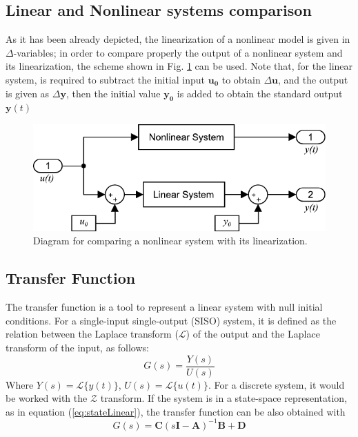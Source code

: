 \subsection{Linear and Nonlinear systems comparison}
As it has been already depicted, the linearization of a nonlinear model is given in $\Delta$-variables; in order to compare properly the output of a nonlinear system and its linearization, the scheme shown in Fig. \ref{fig:howto} can be used. Note that, for the linear system, is required to subtract the initial input $\mathbf{u_0}$ to obtain $\Delta\mathbf{u}$, and the output is given as $\Delta\mathbf{y}$, then the initial value $\mathbf{y_0}$ is added to obtain the standard output $\mathbf{y}(t)$
\begin{figure}[H]
    \centering
    \includegraphics[scale=0.6]{figs/howtoLinearNonlinear.pdf}
    \caption{Diagram for comparing a nonlinear system with its linearization.}
    \label{fig:howto}
\end{figure}

\subsection{Transfer Function}\label{sec:tf}
The transfer function is a tool to represent a linear system with null initial conditions. For a single-input single-output (SISO) system, it is defined as the relation between the Laplace transform ($\mathcal{L}$) of the output and the Laplace transform of the input, as follows:
\begin{equation}
    G(s)=\dfrac{Y(s)}{U(s)}
\end{equation}
Where $Y(s)=\mathcal{L}\{y(t)\}$, $U(s)=\mathcal{L}\{u(t)\}$. For a discrete system, it would be worked with the $\mathcal{Z}$ transform. If the system is in a state-space representation, as in equation (\ref{eq:stateLinear}), the transfer function can be also obtained with
\begin{equation}\label{eq:ss2tf}
    G(s)=\mathbf{C}(s\mathbf{I}-\mathbf{A})^{-1}\mathbf{B}+\mathbf{D}
\end{equation}


